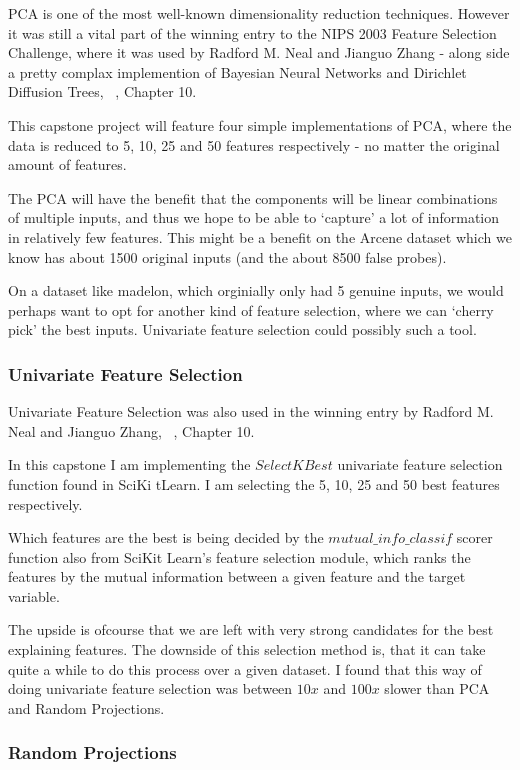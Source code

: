 \documentclass[12pt]{article}
\begin{document}
PCA is one of the most well-known dimensionality reduction techniques. However it was still a vital part of the winning entry to the NIPS 2003 Feature Selection Challenge, where it was used by Radford M. Neal and Jianguo Zhang - along side a pretty complax implemention of Bayesian Neural Networks and Dirichlet Diffusion Trees, ~\cite{nips03book}, Chapter 10.

This capstone project will feature four simple implementations of PCA, where the data is reduced to 5, 10, 25 and 50 features respectively - no matter the original amount of features.

The PCA will have the benefit that the components will be linear combinations of multiple inputs, and thus we hope to be able to `capture' a lot of information in relatively few features. This might be a benefit on the Arcene dataset which we know has about 1500 original inputs (and the about 8500 false probes). 

On a dataset like madelon, which orginially only had 5 genuine inputs, we would perhaps want to opt for another kind of feature selection, where we can `cherry pick' the best inputs. Univariate feature selection could possibly such a tool.

\subsubsection{Univariate Feature Selection}

Univariate Feature Selection was also used in the winning entry by Radford M. Neal and Jianguo Zhang, ~\cite{nips03book}, Chapter 10.

In this capstone I am implementing the $SelectKBest$ univariate feature selection function found in SciKi tLearn. I am selecting the 5, 10, 25 and 50 best features respectively.

Which features are the best is being decided by the $mutual\_info\_classif$ scorer function also from SciKit Learn's feature selection module, which ranks the features by the mutual information between a given feature and the target variable.

The upside is ofcourse that we are left with very strong candidates for the best explaining features. The downside of this selection method is, that it can take quite a while to do this process over a given dataset. I found that this way of doing univariate feature selection was between $10x$ and $100x$ slower than PCA and Random Projections.

\subsubsection{Random Projections}
\end{document}
